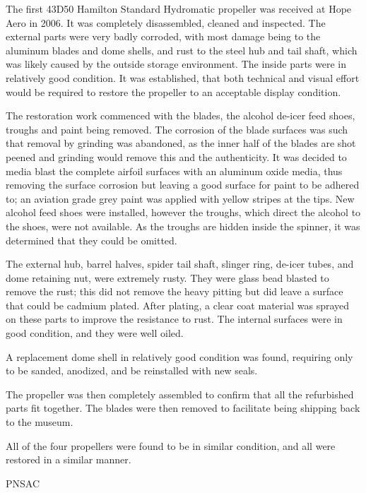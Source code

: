 The first 43D50 Hamilton Standard Hydromatic propeller was received at Hope
Aero in 2006. It was completely disassembled, cleaned and inspected. The
external parts were very badly corroded, with most damage being to the aluminum
blades and dome shells, and rust to the steel hub and tail shaft, which was
likely caused by the outside storage environment. The inside parts were in
relatively good condition. It was established, that both technical and visual
effort would be required to restore the propeller to an acceptable display
condition.

The restoration work commenced with the blades, the alcohol de-icer feed shoes,
troughs and paint being removed. The corrosion of the blade surfaces was such
that removal by grinding was abandoned, as the inner half of the blades are
shot peened and grinding would remove this and the authenticity. It was decided
to media blast the complete airfoil surfaces with an aluminum oxide media, thus
removing the surface corrosion but leaving a good surface for paint to be
adhered to; an aviation grade grey paint was applied with yellow stripes at the
tips. New alcohol feed shoes were installed, however the troughs, which direct
the alcohol to the shoes, were not available. As the troughs are hidden inside
the spinner, it was determined that they could be omitted.

The external hub, barrel halves, spider tail shaft, slinger ring, de-icer
tubes, and dome retaining nut, were extremely rusty. They were glass bead
blasted to remove the rust; this did not remove the heavy pitting but did leave
a surface that could be cadmium plated.  After plating, a clear coat material
was sprayed on these parts to improve the resistance to rust. The internal
surfaces were in good condition, and they were well oiled. 

A replacement dome shell in relatively good condition was found, requiring only
to be sanded, anodized, and be reinstalled with new seals.

The propeller was then completely assembled to confirm that all the refurbished
parts fit together. The blades were then removed to facilitate being shipping
back to the museum.

All of the four propellers were found to be in similar condition, and all were
restored in a similar manner.

\begin{footnotesize}
    \raggedleft PNSAC\\
\end{footnotesize}




